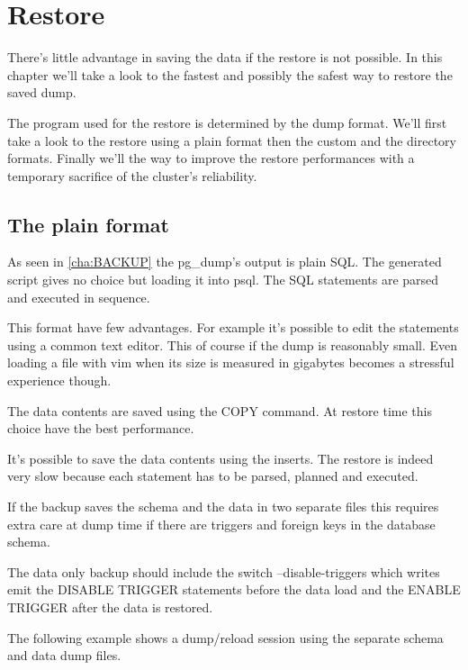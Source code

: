 \chapter{Restore}
\label{cha:RESTORE}
There's little advantage in saving the data if the restore is not possible. In this chapter we'll take a 
look to the fastest and possibly the safest way to restore the saved dump.\newline

The program used for the restore is determined by the dump format. We'll first take a look to the restore 
using a plain format then the custom and  the directory formats. Finally we'll the way to improve 
the restore performances with a temporary sacrifice of the cluster's reliability.

\section{The plain format}
\label{sec:PLAINFORMAT}
As seen in \ref{cha:BACKUP} the pg\_dump's output is plain SQL. The generated script gives no choice but 
loading it into psql. The SQL statements are parsed and executed in sequence.\newline

This format have few advantages. For example it's possible to edit the statements using a common 
text editor. This of course if the dump is reasonably small. Even loading a file with vim when its size is 
measured in gigabytes becomes a stressful experience though.\newline

The data contents are saved using the COPY command. At restore time this choice have the best performance.

It's possible to save the data contents using the inserts. The restore is indeed very slow because each 
statement has to be parsed, planned and executed.\newline

If the backup saves the schema and the data in two separate files this requires extra care at dump time if 
there are triggers and foreign keys in the database schema. 

The data only backup should include the switch --disable-triggers which writes emit the DISABLE 
TRIGGER statements before the data load and the ENABLE TRIGGER after the data is restored.\newline

The following example shows a dump/reload session using the separate schema and data dump files.

